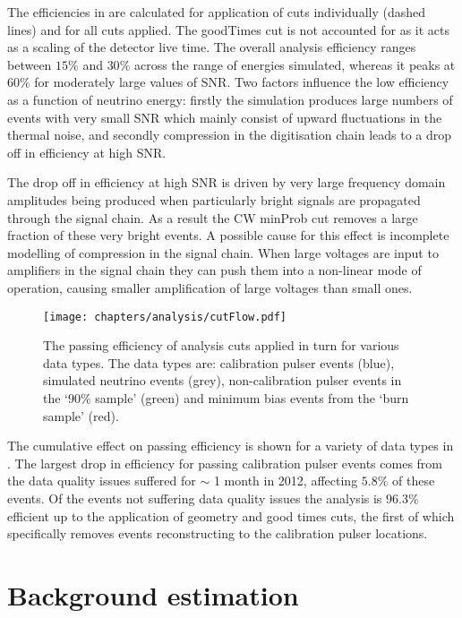 The efficiencies in  are calculated for application of cuts individually (dashed lines) and for all cuts applied. The goodTimes cut is not accounted for as it acts as a scaling of the detector live time. The overall analysis efficiency ranges between $15 \%$ and $30 \%$ across the range of energies simulated, whereas it peaks at $60 \%$ for moderately large values of SNR. Two factors influence the low efficiency as a function of neutrino energy: firstly the simulation produces large numbers of events with very small SNR which mainly consist of upward fluctuations in the thermal noise, and secondly compression in the digitisation chain leads to a drop off in efficiency at high SNR. 

The drop off in efficiency at high SNR is driven by very large frequency domain amplitudes being produced when particularly bright signals are propagated through the signal chain. As a result the CW minProb cut removes a large fraction of these very bright events. A possible cause for this effect is incomplete modelling of compression in the signal chain. When large voltages are input to amplifiers in the signal chain they can push them into a non-linear mode of operation, causing smaller amplification of large voltages than small ones. 

\begin{figure}[hptb]
  \texttt{[image: chapters/analysis/cutFlow.pdf]}
  \caption{The passing efficiency of analysis cuts applied in turn for various data types. The data types are: calibration pulser events (blue), simulated neutrino events (grey), non-calibration pulser events in the `$90 \%$ sample' (green) and minimum bias events from the `burn sample' (red).}
  \label{fig:Analysis:Cut-Results:CutFlow}
\end{figure}

The cumulative effect on passing efficiency is shown for a variety of data types in . The largest drop in efficiency for passing calibration pulser events comes from the data quality issues suffered for $\sim$ 1 month in 2012, affecting $5.8 \%$ of these events. Of the events not suffering data quality issues the analysis is $96.3 \%$ efficient up to the application of geometry and good times cuts, the first of which specifically removes events reconstructing to the calibration pulser locations.

\section{Background estimation}
\label{sec:Analysis:Background-Estimation}

